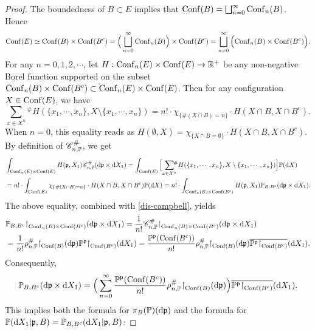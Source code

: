 \documentclass[12pt]{paper}
\numberwithin{theorem}{section}
\numberwithin{figure}{section}
\numberwithin{equation}{section}
\begin{document}
\begin{proof}
The boundedness of  $B\subset E$ implies that $\mathrm{Conf}(B) = \bigsqcup_{n=0}^\infty \mathrm{Conf}_n(B)$.  Hence
\[
\mathrm{Conf}(E)  \simeq \mathrm{Conf}(B) \times \mathrm{Conf}(B^c) =  \Big(  \bigsqcup_{n=0}^\infty \mathrm{Conf}_n(B) \Big)\times \mathrm{Conf}(B^c) =   \bigsqcup_{n=0}^\infty    \Big(   \mathrm{Conf}_n(B) \times \mathrm{Conf}(B^c)  \Big).
\]
For any $n =0, 1, 2, \cdots$, let $H: \mathrm{Conf}_n(E) \times \mathrm{Conf}(E)\rightarrow \mathbb{R}^{+}$ be any non-negative Borel function supported on the subset $\mathrm{Conf}_n(B) \times \mathrm{Conf}(B^c) \subset \mathrm{Conf}_n(E) \times \mathrm{Conf}(E)$. Then  for any configuration $X \in \mathrm{Conf}(E)$, we have
\[
{\sum_{x \in X^n}}\!\!\!^{\#}   H(\{x_1, \cdots, x_n\},  X\setminus \{x_1, \cdots, x_n\})  =   n!  \cdot  \chi_{\{\#(X \cap B) = n \}}  \cdot H( X \cap B,  X \cap B^c).
\]
When $n=0$, this equality reads as $H(\emptyset, X)  =  \chi_{\{X \cap B = \emptyset \}}  \cdot H(X\cap B,  X \cap B^c)$.
By definition of $\mathscr{C}_{n, \mathbb{P}}^\#$, we get
\begin{align*}
&\int_{\mathrm{Conf}_n(E) \times \mathrm{Conf}(E)}   H(\mathfrak{p}, X_1)  \mathscr{C}_{n, \mathbb{P}}^\# (\mathrm{d} \mathfrak{p} \times \mathrm{d} X_1)  = \int_{\mathrm{Conf}(E)}   \Big[{\sum_{x \in X^n}}\!\!\!^{\#}   H(\{x_1, \cdots, x_n\},  X\setminus \{x_1, \cdots, x_n\}) \Big]  \mathbb{P}(\mathrm{d}  X)
\\
& = n!\cdot  \int_{\mathrm{Conf}(E)}      \chi_{\{\# (X\cap B) = n \}}  \cdot H(X \cap B, X\cap B^c)  \mathbb{P}(\mathrm{d} X) =  n!\cdot  \int_{\mathrm{Conf}_n(B) \times \mathrm{Conf}(B^c)} H(\mathfrak{p}, X_1)   \mathbb{P}_{B, B^c}(\mathrm{d} \mathfrak{p} \times \mathrm{d} X_1).
\end{align*}
The above equality, combined  with \eqref{dis-campbell}, yields
\begin{align*}
& \mathbb{P}_{B, B^c}\mathord{\upharpoonright}_{\mathrm{Conf}_n(B) \times \mathrm{Conf}(B^c)}  (\mathrm{d} \mathfrak{p} \times \mathrm{d} X_1)  = \frac{1}{n!}\mathscr{C}_{n, \mathbb{P}}^\#\mathord{\upharpoonright}_{\mathrm{Conf}_n(B) \times \mathrm{Conf}(B^c)}  (\mathrm{d} \mathfrak{p} \times \mathrm{d} X_1)
\\
& = \frac{1}{n!} \rho_{n, \mathbb{P}}^\# \mathord{\upharpoonright}_{\mathrm{Conf}(B)}(\mathrm{d} \mathfrak{p})  \mathbb{P}^{\mathfrak{p}}\mathord{\upharpoonright}_{\mathrm{Conf}(B^c)} ( \mathrm{d}  X_1) =  \frac{\mathbb{P}^{\mathfrak{p}}(\mathrm{Conf}(B^c))  }{n!} \rho_{n, \mathbb{P}}^\# \mathord{\upharpoonright}_{\mathrm{Conf}(B)}(\mathrm{d} \mathfrak{p})  \overline{\mathbb{P}^{\mathfrak{p}}\mathord{\upharpoonright}_{\mathrm{Conf}(B^c)}} ( \mathrm{d}  X_1).
\end{align*}
Consequently,
\[
\mathbb{P}_{B, B^c} (\mathrm{d} \mathfrak{p} \times \mathrm{d} X_1)  =\Big(  \sum_{n=0}^\infty  \frac{\mathbb{P}^{\mathfrak{p}}(\mathrm{Conf}(B^c))  }{n!} \rho_{n, \mathbb{P}}^\# \mathord{\upharpoonright}_{\mathrm{Conf}(B)}(\mathrm{d} \mathfrak{p})  \Big)\overline{\mathbb{P}^{\mathfrak{p}}\mathord{\upharpoonright}_{\mathrm{Conf}(B^c)}} ( \mathrm{d}  X_1).
\]
This implies both the formula for  $\pi_B(\mathbb{P})(\mathrm{d} \mathfrak{p})$ and the formula for $\mathbb{P}(\mathrm{d} X_1| \mathfrak{p}, B) = \mathbb{P}_{B, B^c}(\mathrm{d} X_1 | \mathfrak{p}, B)$:

\end{proof}
\end{document}
